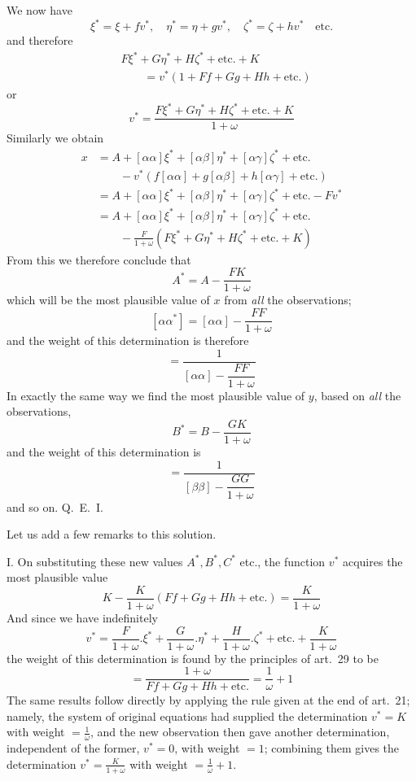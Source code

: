 We now have
\[
\xi^*=\xi+fv^*,\quad\eta^*=\eta+gv^*,\quad\zeta^*=\zeta+hv^*\quad\text{etc.}
\]
and therefore
\[
\begin{aligned}
&F\xi^*+G\eta^*+H\zeta^*+\text{etc.}+K\\
&\qquad=v^*(1+Ff+Gg+Hh+\text{etc.})
\end{aligned}
\]
or
\[
v^*=\frac{F\xi^*+G\eta^*+H\zeta^*+\text{etc.}+K}{1+\omega}
\]
\noindent Similarly we obtain
\[
\begin{aligned}
x&=A+[\alpha\alpha]\xi^*+[\alpha\beta]\eta^*+[\alpha\gamma]\zeta^*+\text{etc.}\\
&\qquad-v^*(f[\alpha\alpha]+g[\alpha\beta]+h[\alpha\gamma]+\text{etc.})\\
&=A+[\alpha\alpha]\xi^*+[\alpha\beta]\eta^*+[\alpha\gamma]\zeta^*+\text{etc.}-Fv^*\\
&=A+[\alpha\alpha]\xi^*+[\alpha\beta]\eta^*+[\alpha\gamma]\zeta^*+\text{etc.}\\
&\qquad-\frac{F}{1+\omega}(F\xi^*+G\eta^*+H\zeta^*+\text{etc.}+K)
\end{aligned}
\]
From this we therefore conclude that
\[
A^*=A-\frac{FK}{1+\omega}
\]
which will be the most plausible value of \(x\) from \textit{all} the observations;
\[
[\alpha\alpha^*]=[\alpha\alpha]-\frac{FF}{1+\omega}
\]
and the weight of this determination is therefore
\[
=\frac1{[\alpha\alpha]-\dfrac{FF}{1+\omega}}
\]
In exactly the same way we find the most plausible value of \(y\), based on \textit{all} the observations,
\[
B^*=B-\frac{GK}{1+\omega}
\]
and the weight of this determination is
\[
=\frac1{[\beta\beta]-\dfrac{GG}{1+\omega}}
\]
and so on. Q.\ E.\ I.

Let us add a few remarks to this solution.

I. On substituting these new values \(A^*,B^*,C^*\) etc., the function \(v^*\) acquires the most plausible value
\[
K-\frac{K}{1+\omega}(Ff+Gg+Hh+\text{etc.})=\frac{K}{1+\omega}
\]
And since we have indefinitely
\[
v^*=\frac{F}{1+\omega}.\xi^*+\frac{G}{1+\omega}.\eta^*+\frac{H}{1+\omega}.\zeta^*+\text{etc.}+\frac{K}{1+\omega}
\]
%
the weight of this determination is found by the principles of art.\ 29 to be
\[
=\frac{1+\omega}{Ff+Gg+Hh+\text{etc.}}=\frac1\omega+1
\]
The same results follow directly by applying the rule given at the end of art.\ 21; namely, the system of original equations had supplied the determination \(v^*=K\) with weight \(=\frac1\omega\), and the new observation then gave another determination, independent of the former, \(v^*=0\), with weight \(=1\); combining them gives the determination \(v^*=\frac{K}{1+\omega}\) with weight \(=\frac1\omega+1\).

